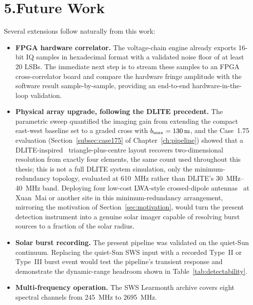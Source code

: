 \section*{5.\quad Future Work}

Several extensions follow naturally from this work:

\begin{itemize}[leftmargin=1.5em]
  \item \textbf{FPGA hardware correlator.} The voltage-chain engine already exports
        16-bit IQ samples in hexadecimal format with a validated noise floor of at
        least 20 LSBs. The immediate next step is to stream these samples to an FPGA
        cross-correlator board and compare the hardware fringe amplitude with the
        software result sample-by-sample, providing an end-to-end hardware-in-the-loop
        validation.
  \item \textbf{Physical array upgrade, following the DLITE precedent.} The parametric
        sweep quantified the imaging gain from extending the compact east-west baseline
        set to a graded cross with $b_{\rm max}=\SI{130}{\metre}$, and the Case~1.75
        evaluation (Section~\ref{subsec:case175} of Chapter~\ref{ch:pipeline}) showed
        that a DLITE-inspired~\citep{helmboldt2021dlite} triangle-plus-centre layout
        recovers two-dimensional resolution from exactly four elements, the same count
        used throughout this thesis; this is not a full DLITE system simulation, only
        the minimum-redundancy topology, evaluated at \SI{610}{\mega\hertz} rather than
        DLITE's \SIrange{30}{40}{\mega\hertz} band. Deploying four low-cost LWA-style
        crossed-dipole antennas~\citep{lwa_pricing} at Xuan~Mai or another site in this
        minimum-redundancy arrangement, mirroring the motivation of
        Section~\ref{sec:motivation}, would turn the present detection instrument into a
        genuine solar imager capable of resolving burst sources to a fraction of the
        solar radius.
  \item \textbf{Solar burst recording.} The present pipeline was validated on the
        quiet-Sun continuum. Replacing the quiet-Sun SWS input with a recorded
        Type~II or Type~III burst event would test the pipeline's transient response
        and demonstrate the dynamic-range headroom shown in Table~\ref{tab:detectability}.
  \item \textbf{Multi-frequency operation.} The SWS Learmonth archive covers eight
        spectral channels from \SI{245}{\mega\hertz} to \SI{2695}{\mega\hertz}.

\end{itemize}
